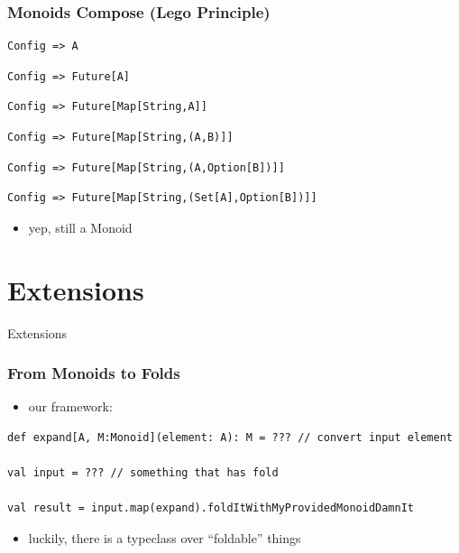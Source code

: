 \documentclass[aspectratio=169]{beamer}
\begin{document}
\begin{frame}[fragile]
  \frametitle{Monoids Compose (Lego Principle)}
\begin{verbatim}
Config => A
\end{verbatim}
\begin{verbatim}
Config => Future[A]
\end{verbatim}
\begin{verbatim}
Config => Future[Map[String,A]]
\end{verbatim}
\begin{verbatim}
Config => Future[Map[String,(A,B)]]
\end{verbatim}
\begin{verbatim}
Config => Future[Map[String,(A,Option[B])]]
\end{verbatim}
\begin{verbatim}
Config => Future[Map[String,(Set[A],Option[B])]]
\end{verbatim}
\vfill
\begin{itemize}
\item<6-> yep, still a Monoid
\end{itemize}
\end{frame}

\section{Extensions}

\begin{frame}
  \begin{center}
    \Huge
    Extensions
  \end{center}
\end{frame}

\begin{frame}[fragile]
  \frametitle{From Monoids to Folds}
  \begin{itemize}
  \item our framework:
  \end{itemize}
  \begin{verbatim}
def expand[A, M:Monoid](element: A): M = ??? // convert input element

val input = ??? // something that has fold

val result = input.map(expand).foldItWithMyProvidedMonoidDamnIt
  \end{verbatim}
  \begin{itemize}
  \item<2> luckily, there is a typeclass over ``foldable'' things
  \end{itemize}
\end{frame}
\end{document}
